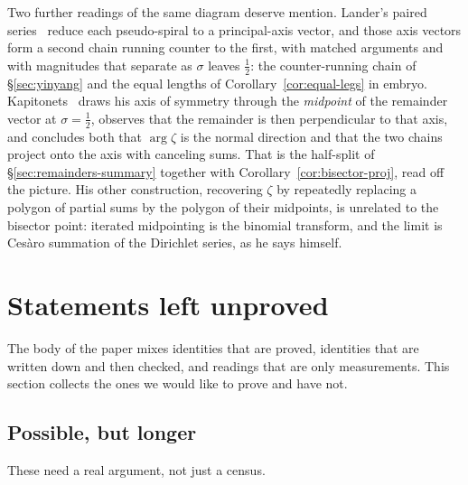 \documentclass[11pt]{article}
\theoremstyle{definition}
\begin{document}
Two further readings of the same diagram deserve mention. Lander's paired
series~\cite{Lander2017,Lander2018} reduce each pseudo-spiral to a principal-axis
vector, and those axis vectors form a second chain running counter to the first,
with matched arguments and with magnitudes that separate as $\sigma$ leaves
$\tfrac12$: the counter-running chain of \S\ref{sec:yinyang} and the equal
lengths of Corollary~\ref{cor:equal-legs} in embryo.
Kapitonets~\cite{Kapitonets2019} draws his axis of symmetry through the
\emph{midpoint} of the remainder vector at $\sigma=\tfrac12$, observes that the
remainder is then perpendicular to that axis, and concludes both that
$\arg\zeta$ is the normal direction and that the two chains project onto the axis
with canceling sums. That is the half-split of
\S\ref{sec:remainders-summary} together with Corollary~\ref{cor:bisector-proj},
read off the picture. His other construction,
recovering $\zeta$ by repeatedly replacing a polygon of partial sums by the
polygon of their midpoints, is unrelated to the bisector point: iterated
midpointing is the binomial transform, and the limit is Ces\`aro summation of the
Dirichlet series, as he says himself.

\section{Statements left unproved}\label{sec:unproved}

The body of the paper mixes identities that are proved, identities that
are written down and then checked, and readings that are only
measurements. This section collects the ones we would like to prove and
have not.

\subsection*{Possible, but longer}

These need a real argument, not just a census.
\end{document}
